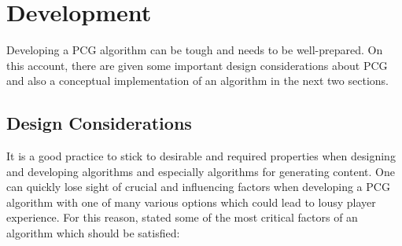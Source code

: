 \documentclass[MGS,Master,english]{twbook}%
\begin{document}
\section{Development} \label{pcgDevelopment}
Developing a PCG algorithm can be tough and needs to be well-prepared. On this account, there are given some important design considerations about PCG and also a conceptual implementation of an algorithm in the next two sections.

\subsection{Design Considerations}
It is a good practice to stick to desirable and required properties when designing and developing algorithms and especially algorithms for generating content. One can quickly lose sight of crucial and influencing factors when developing a PCG algorithm with one of many various options which could lead to lousy player experience. For this reason, \citep{pcg::book} stated some of the most critical factors of an algorithm which should be satisfied:
\end{document}
